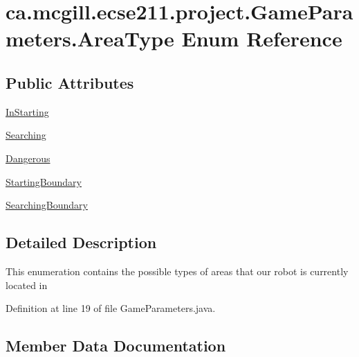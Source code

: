 \hypertarget{enumca_1_1mcgill_1_1ecse211_1_1project_1_1_game_parameters_1_1_area_type}{}\section{ca.\+mcgill.\+ecse211.\+project.\+Game\+Parameters.\+Area\+Type Enum Reference}
\label{enumca_1_1mcgill_1_1ecse211_1_1project_1_1_game_parameters_1_1_area_type}
\subsection*{Public Attributes}
\begin{DoxyCompactItemize}
\item 
\hyperlink{enumca_1_1mcgill_1_1ecse211_1_1project_1_1_game_parameters_1_1_area_type_a90e9cb33114c7af62aa86684942265e5}{In\+Starting}
\item 
\hyperlink{enumca_1_1mcgill_1_1ecse211_1_1project_1_1_game_parameters_1_1_area_type_a25564076fdd8880377fbd6eaf753456f}{Searching}
\item 
\hyperlink{enumca_1_1mcgill_1_1ecse211_1_1project_1_1_game_parameters_1_1_area_type_ac762256f8b33e7c93c162520a0349769}{Dangerous}
\item 
\hyperlink{enumca_1_1mcgill_1_1ecse211_1_1project_1_1_game_parameters_1_1_area_type_afd78c1184c6b82e22bb08ed39ae4e83b}{Starting\+Boundary}
\item 
\hyperlink{enumca_1_1mcgill_1_1ecse211_1_1project_1_1_game_parameters_1_1_area_type_a5a3aceb665ba97ac242e77955feed640}{Searching\+Boundary}
\end{DoxyCompactItemize}


\subsection{Detailed Description}
This enumeration contains the possible types of areas that our robot is currently located in 

Definition at line 19 of file Game\+Parameters.\+java.



\subsection{Member Data Documentation}
\mbox{\label{enumca_1_1mcgill_1_1ecse211_1_1project_1_1_game_parameters_1_1_area_type_ac762256f8b33e7c93c162520a0349769}} 
